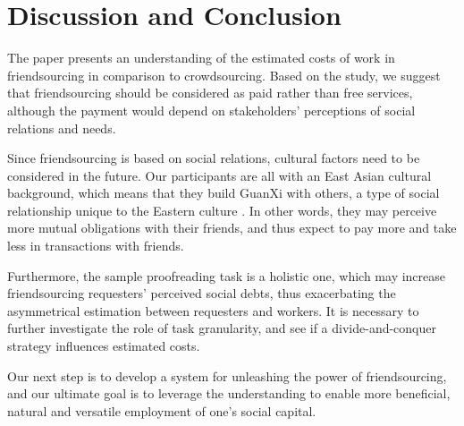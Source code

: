\section{Discussion and Conclusion}
The paper presents an understanding of the estimated costs of work in friendsourcing in comparison to crowdsourcing. 
Based on the study, we suggest that friendsourcing should be considered as paid rather than free services, 
although the payment would depend on stakeholders' perceptions of social relations and needs. 

Since friendsourcing is based on social relations, cultural factors need to be considered in the future. 
Our participants are all with an East Asian cultural background, which means that they build GuanXi with others, 
a type of social relationship unique to the Eastern culture \cite{Fan:InterBusinessReview02:GunaXiDef}. 
In other words, they may perceive more mutual obligations with their friends, 
and thus expect to pay more and take less in transactions with friends.
 
Furthermore, the sample proofreading task is a holistic one, 
which may increase friendsourcing requesters' perceived social debts, 
thus exacerbating the asymmetrical estimation between requesters and workers. 
It is necessary to further investigate the role of task granularity, 
and see if a divide-and-conquer strategy influences estimated costs.

Our next step is to develop a system for unleashing the power of friendsourcing, 
and our ultimate goal is to leverage the understanding to enable more beneficial, 
natural and versatile employment of one's social capital.



%
%
%
%
%


